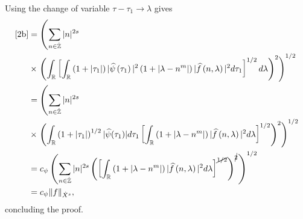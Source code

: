\documentclass[12pt,reqno]{amsart}
\numberwithin{equation}{section}  %
\numberwithin{figure}{section}
\newcommand{\rr}{\mathbb{R}}
\newcommand{\zz}{\mathbb{Z}}
\newcommand{\zzdot}{\dot{\zz}}
\newcommand{\wh}{\widehat}
\theoremstyle{plain}
\theoremstyle{definition}
\theoremstyle{remark}
\begin{document}
%
%
Using the change of variable $\tau - \tau_1 \to \lambda$ gives
%
%
\begin{equation*}
	\begin{split}
		\eqref{2b}
		& = \left( \sum_{n \in \zzdot} |n|^{2s}\right.
		\\
		& \times \left.  \left( \int_\rr \left[
		\int_\rr \left( 1 + | \tau_1 | \right) | \wh{\psi}\left( \tau_1
		\right) |^2 \left( 1 + | \lambda - n^{m} | \right) | \wh{f} \left( n,
		\lambda
		\right)|^2 d \tau_1 \right]^{1/2} d \lambda \right)^2 \right)^{1/2}
		\\
		& =  \left( \sum_{n \in \zzdot} |n|^{2s} \right.
		\\
		& \times \left. \left( \int_\rr \left( 1 + |
		\tau_1 |
		\right)^{1/2} | \wh{\psi}(\tau_1) | d \tau_1 \left[ \int_\rr \left( 1 + |
		\lambda - n^{m} |
		\right) | \wh{f}\left( n, \lambda \right) |^2 d \lambda \right]^{1/2}
		\right)^2 \right)^{1/2}
		\\
		& = c_{\psi} \left( \sum_{n \in \zzdot} |n|^{2s} \left( \left[ \int_\rr
		\left( 1 + | \lambda - n^{m} | \right) | \wh{f}\left( n, \lambda
		\right) |^2 d \lambda
		\right]^{\cancel{1/2}} \right)^{\cancel{2}} \right)^{1/2}
		\\
		& = c_{\psi} \|f\|_{\dot{X}^s},
	\end{split}
\end{equation*}
%
%
concluding the proof. \qquad \qedsymbol

%
\end{document}
